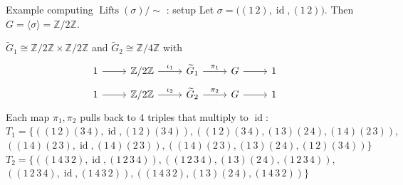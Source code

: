 \documentclass[xcolor=dvipsnames]{beamer}
\theoremstyle{plain}
\newcommand{\ZZ}{\mathbb Z}
\newcommand{\wt}[1]{\widetilde{#1}}
\DeclareMathOperator{\Lifts}{Lifts}
\DeclareMathOperator{\id}{id}
\begin{document}
  \begin{frame}[fragile]{Example computing $\Lifts(\sigma)/\!\!\sim$ : setup}
    Let $\sigma = \big((1\,2),\id,(1\,2)\big)$.
    Then $G = \langle\sigma\rangle = \ZZ/2\ZZ$.
    \par
    $\wt{G}_1\cong\ZZ/2\ZZ\times\ZZ/2\ZZ$
    and
    $\wt{G}_2\cong\ZZ/4\ZZ$ with
    \begin{align*}
      \begin{tikzcd}[ampersand replacement=\&, row sep = small]
        1\arrow{r}\&\ZZ/2\ZZ\arrow{r}{\iota_1}\&\wt{G}_1\arrow{r}{\pi_1}\&G\arrow{r}\&1
      \end{tikzcd}
      \\
      \begin{tikzcd}[ampersand replacement=\&, row sep = small]
        1\arrow{r}\&\ZZ/2\ZZ\arrow{r}{\iota_2}\&\wt{G}_2\arrow{r}{\pi_2}\&G\arrow{r}\&1
      \end{tikzcd}
    \end{align*}
    Each map $\pi_1,\pi_2$ pulls back to
    $4$ triples that multiply to $\id$:
    $T_1=
    \Big\{((1\,2)(3\,4), \id, (1\,2)(3\,4)),
    ((1\,2)(3\,4), (1\,3)(2\,4), (1\,4)(2\,3)),$
    $((1\,4)(2\,3), \id, (1\,4)(2\,3)),
    ((1\,4)(2\,3), (1\,3)(2\,4), (1\,2)(3\,4))
    \Big\}$
    $T_2=
    \Big\{
    ((1\,4\,3\,2), \id, (1\,2\,3\,4)),
    ((1\,2\,3\,4), (1\,3)(2\,4), (1\,2\,3\,4)),$
    $((1\,2\,3\,4), \id, (1\,4\,3\,2)),
    ((1\,4\,3\,2), (1\,3)(2\,4), (1\,4\,3\,2))
    \Big\}$
  \end{frame}
\end{document}
